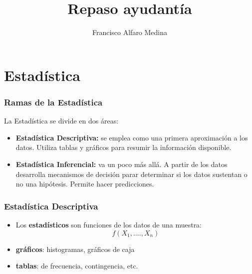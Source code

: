 \documentclass{beamer}
\title{ Repaso ayudantía}
\author{Francisco Alfaro Medina}
\institute[USM]
{Universidad Técnica Federico Santa María\\ %
	\medskip
	\textit{} %
	
}
\date{}
\begin{document}
	
\begin{frame}
	\titlepage %
\end{frame}
	
\section{Estadística}


\begin{frame}
\frametitle{Ramas de la  Estadística }
La Estadística se divide en dos
áreas:

\begin{itemize}
\item\textbf{{\color{blue} Estadística Descriptiva:}} se emplea como una primera aproximación a los datos. Utiliza tablas y gráficos para resumir la información disponible.
\item \textbf{{\color{blue} Estadística Inferencial:}} va un poco más allá. A partir de los datos desarrolla mecanismos de decisión parar determinar si los datos sustentan o no una hipótesis. Permite hacer predicciones. 
\end{itemize}

\end{frame}



\begin{frame}
\frametitle{ Estadística Descriptiva}

\begin{itemize}
\item Los \textbf{{\color{blue}estadísticos}} son funciones de los datos de una muestra:
$$f(X_1,....,X_n)$$
\item \textbf{gráficos}: histogramas, gráficos de caja
\item \textbf{tablas}: de frecuencia, contingencia, etc.
\end{itemize}
\end{frame}


\end{document}
